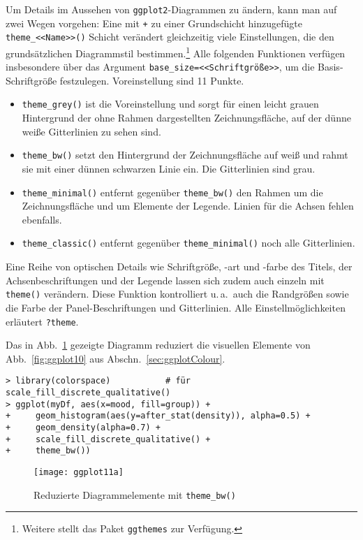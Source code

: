 Um Details im Aussehen von \lstinline!ggplot2!-Diagrammen zu ändern, kann man auf zwei Wegen vorgehen: Eine mit \lstinline!+! zu einer Grundschicht hinzugefügte \lstinline!theme_<<Name>>()! Schicht verändert gleichzeitig viele Einstellungen, die den grundsätzlichen Diagrammstil bestimmen.\footnote{Weitere stellt das Paket  \lstinline!ggthemes! \cite{Arnold2016} zur Verfügung.} Alle folgenden Funktionen verfügen insbesondere über das Argument \lstinline!base_size=<<Schriftgröße>>!, um die Basis-Schriftgröße festzulegen. Voreinstellung sind 11 Punkte.
\begin{itemize}
\item {}\lstinline!theme_grey()! ist die Voreinstellung und sorgt für einen leicht grauen Hintergrund der ohne Rahmen dargestellten Zeichnungsfläche, auf der dünne weiße Gitterlinien zu sehen sind.
\item {}\lstinline!theme_bw()! setzt den Hintergrund der Zeichnungsfläche auf weiß und rahmt sie mit einer dünnen schwarzen Linie ein. Die Gitterlinien sind grau.
\item {}\lstinline!theme_minimal()! entfernt gegenüber \lstinline!theme_bw()! den Rahmen um die Zeichnungsfläche und um Elemente der Legende. Linien für die Achsen fehlen ebenfalls.
\item {}\lstinline!theme_classic()! entfernt gegenüber \lstinline!theme_minimal()! noch alle Gitterlinien.
\end{itemize}

Eine Reihe von optischen Details wie Schriftgröße, -art und -farbe des Titels, der Achsenbeschriftungen und der Legende lassen sich zudem auch einzeln mit \lstinline!theme()! verändern. Diese Funktion kontrolliert u.\,a.\ auch die Randgrößen sowie die Farbe der Panel-Beschriftungen und Gitterlinien. Alle Einstellmöglichkeiten erläutert \lstinline!?theme!.

Das in Abb.\ \ref{fig:ggplot11} gezeigte Diagramm reduziert die visuellen Elemente von Abb.\ \ref{fig:ggplot10} aus Abschn.\ \ref{sec:ggplotColour}.
\begin{lstlisting}
> library(colorspace)           # für scale_fill_discrete_qualitative()
> ggplot(myDf, aes(x=mood, fill=group)) +
+     geom_histogram(aes(y=after_stat(density)), alpha=0.5) +
+     geom_density(alpha=0.7) +
+     scale_fill_discrete_qualitative() +
+     theme_bw())
\end{lstlisting}

\begin{figure}[ht]
\centering
\texttt{[image: ggplot11a]}
\vspace*{-0.5em}
\caption{Reduzierte Diagrammelemente mit \lstinline!theme_bw()!}
\label{fig:ggplot11}
\end{figure}

